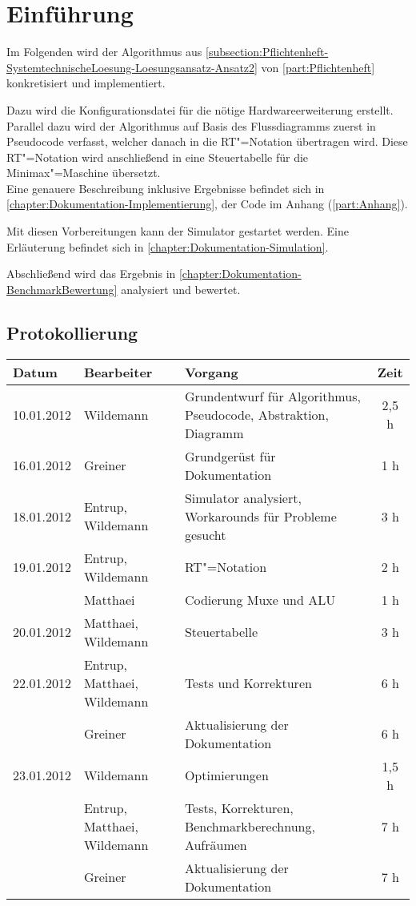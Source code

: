 \chapter{Einführung}
\label{chapter:Dokumentation-Einfuehrung}

Im Folgenden wird der Algorithmus aus \autoref{subsection:Pflichtenheft-SystemtechnischeLoesung-Loesungsansatz-Ansatz2} von \autoref{part:Pflichtenheft} konkretisiert und implementiert.

Dazu wird die Konfigurationsdatei für die nötige Hardwareerweiterung erstellt. Parallel dazu wird der Algorithmus auf Basis des Flussdiagramms zuerst in Pseudocode verfasst, welcher danach in die RT"=Notation übertragen wird. Diese RT"=Notation wird anschließend in eine Steuertabelle für die Minimax"=Maschine übersetzt.\\
Eine genauere Beschreibung inklusive Ergebnisse befindet sich in \autoref{chapter:Dokumentation-Implementierung}, der Code im Anhang (\autoref{part:Anhang}).

Mit diesen Vorbereitungen kann der Simulator gestartet werden. Eine Erläuterung befindet sich in \autoref{chapter:Dokumentation-Simulation}.

Abschließend wird das Ergebnis in \autoref{chapter:Dokumentation-BenchmarkBewertung} analysiert und bewertet.


\section{Protokollierung}
\label{section:Dokumentation-Einfuehrung-Protokollierung}

\begin{tabularx}{\textwidth}{|l|l|X|c|}
    \hline
    Datum & Bearbeiter & Vorgang & Zeit \\
    \hline
    \hline
    10.01.2012 & Wildemann & Grundentwurf für Algorithmus, Pseudocode, Abstraktion, Diagramm & 2,5 h \\
    \hline
    16.01.2012 & Greiner & Grundgerüst für Dokumentation & 1 h \\
    \hline
    18.01.2012 & Entrup, Wildemann & Simulator analysiert, Workarounds für Probleme gesucht & 3 h \\
    \hline
    19.01.2012 & Entrup, Wildemann & RT"=Notation & 2 h\\
               & Matthaei & Codierung Muxe und ALU & 1 h\\
    \hline
    20.01.2012 & Matthaei, Wildemann & Steuertabelle & 3 h\\
    \hline
    22.01.2012 & Entrup, Matthaei, Wildemann & Tests und Korrekturen & 6 h\\
               & Greiner & Aktualisierung der Dokumentation & 6 h \\
    \hline
    23.01.2012 & Wildemann & Optimierungen & 1,5 h \\
               & Entrup, Matthaei, Wildemann & Tests, Korrekturen, Benchmarkberechnung, Aufräumen & 7 h \\
               & Greiner & Aktualisierung der Dokumentation & 7 h \\
    \hline
\end{tabularx}
